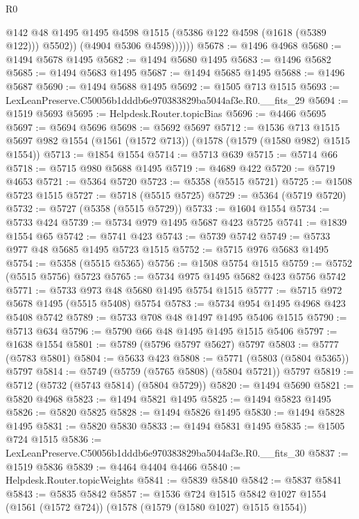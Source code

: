 \begin{lexlean}{R0}
\begin{coremodule}
                  @142
                  @48
                  @1495
                  @1495
                  @4598
                  @1515
                  (@5386 @122 @4598 (@1618 (@5389 @122)))
                  @5502))
              (@4904 @5306 @4598))))))
@5678 := @1496 @4968
@5680 := @1494 @5678 @1495
@5682 := @1494 @5680 @1495
@5683 := @1496 @5682
@5685 := @1494 @5683 @1495
@5687 := @1494 @5685 @1495
@5688 := @1496 @5687
@5690 := @1494 @5688 @1495
@5692 := @1505 @713 @1515
@5693 := LexLeanPreserve.C50056b1dddb6e970383829ba5044af3e.R0.__fits_29
@5694 := @1519 @5693
@5695 := Helpdesk.Router.topicBias
@5696 := @4466 @5695
@5697 := @5694 @5696
@5698 := @5692 @5697
@5712 := @1536
    @713
    @1515
    @5697
    @982
    @1554
    (@1561 (@1572 @713))
    (@1578 (@1579 (@1580 @982) @1515 @1554))
@5713 := @1854 @1554
@5714 := @5713 @639
@5715 := @5714 @66
@5718 := @5715 @980 @5688 @1495
@5719 := @4689 @422
@5720 := @5719 @4653
@5721 := @5364 @5720
@5723 := @5358 (@5515 @5721)
@5725 := @1508 @5723 @1515
@5727 := @5718 (@5515 @5725)
@5729 := @5364 (@5719 @5720)
@5732 := @5727 (@5358 (@5515 @5729))
@5733 := @1604 @1554
@5734 := @5733 @424
@5739 := @5734 @979 @1495 @5687 @423 @5725
@5741 := @1839 @1554 @65
@5742 := @5741 @423
@5743 := @5739 @5742
@5749 := @5733 @977 @48 @5685 @1495 @5723 @1515
@5752 := @5715 @976 @5683 @1495
@5754 := @5358 (@5515 @5365)
@5756 := @1508 @5754 @1515
@5759 := @5752 (@5515 @5756) @5723
@5765 := @5734 @975 @1495 @5682 @423 @5756 @5742
@5771 := @5733 @973 @48 @5680 @1495 @5754 @1515
@5777 := @5715 @972 @5678 @1495 (@5515 @5408) @5754
@5783 := @5734 @954 @1495 @4968 @423 @5408 @5742
@5789 := @5733 @708 @48 @1497 @1495 @5406 @1515
@5790 := @5713 @634
@5796 := @5790 @66 @48 @1495 @1495 @1515 @5406
@5797 := @1638 @1554
@5801 := @5789 (@5796 @5797 @5627) @5797
@5803 := @5777 (@5783 @5801)
@5804 := @5633 @423
@5808 := @5771 (@5803 (@5804 @5365)) @5797
@5814 := @5749 (@5759 (@5765 @5808) (@5804 @5721)) @5797
@5819 := @5712 (@5732 (@5743 @5814) (@5804 @5729))
@5820 := @1494 @5690
@5821 := @5820 @4968
@5823 := @1494 @5821 @1495
@5825 := @1494 @5823 @1495
@5826 := @5820 @5825
@5828 := @1494 @5826 @1495
@5830 := @1494 @5828 @1495
@5831 := @5820 @5830
@5833 := @1494 @5831 @1495
@5835 := @1505 @724 @1515
@5836 := LexLeanPreserve.C50056b1dddb6e970383829ba5044af3e.R0.__fits_30
@5837 := @1519 @5836
@5839 := @4464 @4404 @4466
@5840 := Helpdesk.Router.topicWeights
@5841 := @5839 @5840
@5842 := @5837 @5841
@5843 := @5835 @5842
@5857 := @1536
    @724
    @1515
    @5842
    @1027
    @1554
    (@1561 (@1572 @724))
    (@1578 (@1579 (@1580 @1027) @1515 @1554))

\end{coremodule}
\end{lexlean}
